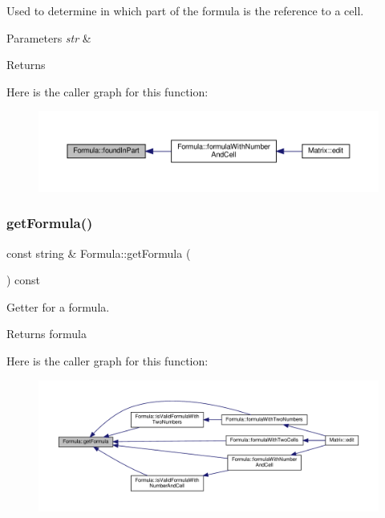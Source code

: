 Used to determine in which part of the formula is the reference to a cell. 
\begin{DoxyParams}{Parameters}
{\em str} & \\
\hline
\end{DoxyParams}
\begin{DoxyReturn}{Returns}

\end{DoxyReturn}
Here is the caller graph for this function\+:\nopagebreak
\begin{figure}[H]
\begin{center}
\leavevmode
\includegraphics[width=350pt]{class_formula_a79079cea46f8320cd7a63f576251baac_icgraph}
\end{center}
\end{figure}
\mbox{\label{class_formula_a1b9557287ed502f9523c5c7b1805bac1}} 
\subsubsection{\texorpdfstring{get\+Formula()}{getFormula()}}
{\footnotesize\ttfamily const string \& Formula\+::get\+Formula (\begin{DoxyParamCaption}{ }\end{DoxyParamCaption}) const}

Getter for a formula. \begin{DoxyReturn}{Returns}
formula 
\end{DoxyReturn}
Here is the caller graph for this function\+:\nopagebreak
\begin{figure}[H]
\begin{center}
\leavevmode
\includegraphics[width=350pt]{class_formula_a1b9557287ed502f9523c5c7b1805bac1_icgraph}
\end{center}
\end{figure}
\mbox{\label{class_formula_a8080ff3cf8fce2d9f1730e772ae21c71}} 
